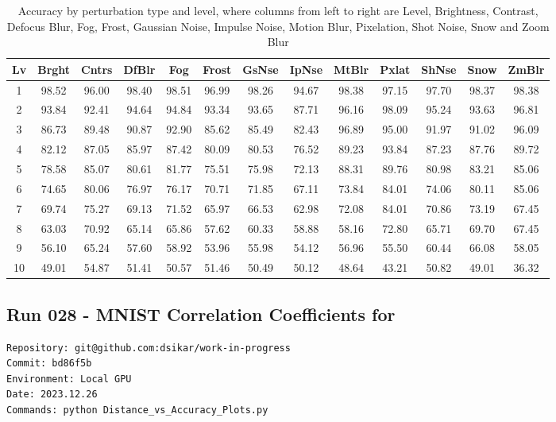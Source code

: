 \begin{table}[ht]
\centering
\begin{tabular}{|c|c|c|c|c|c|c|c|c|c|c|c|c|}
\hline
Lv & Brght & Cntrs & DfBlr & Fog & Frost & GsNse & IpNse & MtBlr & Pxlat & ShNse & Snow & ZmBlr \\
\hline
1 & 98.52 & 96.00 & 98.40 & 98.51 & 96.99 & 98.26 & 94.67 & 98.38 & 97.15 & 97.70 & 98.37 & 98.38 \\
2 & 93.84 & 92.41 & 94.64 & 94.84 & 93.34 & 93.65 & 87.71 & 96.16 & 98.09 & 95.24 & 93.63 & 96.81 \\
3 & 86.73 & 89.48 & 90.87 & 92.90 & 85.62 & 85.49 & 82.43 & 96.89 & 95.00 & 91.97 & 91.02 & 96.09 \\
4 & 82.12 & 87.05 & 85.97 & 87.42 & 80.09 & 80.53 & 76.52 & 89.23 & 93.84 & 87.23 & 87.76 & 89.72 \\
5 & 78.58 & 85.07 & 80.61 & 81.77 & 75.51 & 75.98 & 72.13 & 88.31 & 89.76 & 80.98 & 83.21 & 85.06 \\
6 & 74.65 & 80.06 & 76.97 & 76.17 & 70.71 & 71.85 & 67.11 & 73.84 & 84.01 & 74.06 & 80.11 & 85.06 \\
7 & 69.74 & 75.27 & 69.13 & 71.52 & 65.97 & 66.53 & 62.98 & 72.08 & 84.01 & 70.86 & 73.19 & 67.45 \\
8 & 63.03 & 70.92 & 65.14 & 65.86 & 57.62 & 60.33 & 58.88 & 58.16 & 72.80 & 65.71 & 69.70 & 67.45 \\
9 & 56.10 & 65.24 & 57.60 & 58.92 & 53.96 & 55.98 & 54.12 & 56.96 & 55.50 & 60.44 & 66.08 & 58.05 \\
10 & 49.01 & 54.87 & 51.41 & 50.57 & 51.46 & 50.49 & 50.12 & 48.64 & 43.21 & 50.82 & 49.01 & 36.32 \\
\hline
\end{tabular}
\caption{Accuracy by perturbation type and level, where columns from left to right are Level, Brightness, Contrast, Defocus Blur, Fog, Frost, Gaussian Noise, Impulse Noise, Motion Blur, Pixelation, Shot Noise, Snow and Zoom Blur}
\label{Accuracy vs noise levels for all noise types}
\end{table}



\subsection{Run 028 - MNIST  Correlation Coefficients for  }
\label{app_res:028}
\begin{verbatim}
Repository: git@github.com:dsikar/work-in-progress
Commit: bd86f5b
Environment: Local GPU
Date: 2023.12.26
Commands: python Distance_vs_Accuracy_Plots.py
\end{verbatim}



